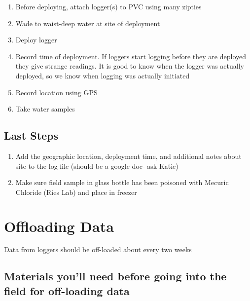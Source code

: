 \documentclass[
  letterpaper,
  DIV=11,
  numbers=noendperiod]{scrreprt}
\begin{document}
\begin{enumerate}
\def\labelenumi{\arabic{enumi}.}
\item
  Before deploying, attach logger(s) to PVC using many zipties
\item
  Wade to waist-deep water at site of deployment
\item
  Deploy logger
\item
  Record time of deployment. If loggers start logging before they are
  deployed they give strange readings. It is good to know when the
  logger was actually deployed, so we know when logging was actually
  initiated
\item
  Record location using GPS
\item
  Take water samples
\end{enumerate}

\hypertarget{last-steps}{%
\subsection*{\texorpdfstring{\textbf{Last
Steps}}{Last Steps}}\label{last-steps}}

\begin{enumerate}
\def\labelenumi{\arabic{enumi}.}
\item
  Add the geographic location, deployment time, and additional notes
  about site to the log file (should be a google doc- ask Katie)
\item
  Make sure field sample in glass bottle has been poisoned with Mecuric
  Chloride (Ries Lab) and place in freezer
\end{enumerate}

\hypertarget{offloading-data}{%
\section*{\texorpdfstring{\textbf{Offloading
Data}}{Offloading Data}}\label{offloading-data}}


Data from loggers should be off-loaded about every two weeks

\hypertarget{materials-youll-need-before-going-into-the-field-for-off-loading-data}{%
\subsection*{\texorpdfstring{\textbf{Materials you'll need before going
into the field for off-loading
data}}{Materials you'll need before going into the field for off-loading data}}\label{materials-youll-need-before-going-into-the-field-for-off-loading-data}}
\end{document}
